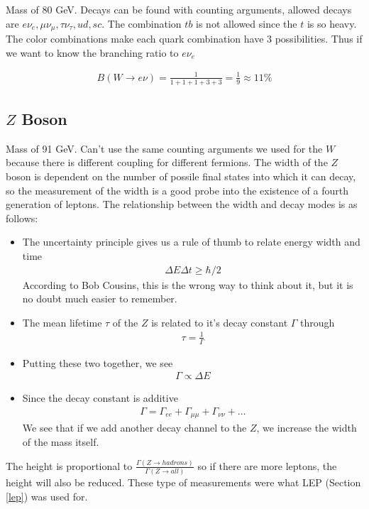 Mass of 80 GeV. Decays can be found with counting arguments, allowed decays are $e\nu_e, \mu\nu_\mu,\tau\nu_\tau, ud, sc$. The combination $tb$ is not allowed since the $t$ is so heavy. The color combinations make each quark combination have 3 possibilities. Thus if we want to know the branching ratio to $e\nu_e$

\begin{align}
B(W\rightarrow e\nu) = \frac{1}{1+1+1+3+3} = \frac{1}{9}\approx 11\%
\end{align}

\subsection{$Z$ Boson}

Mass of 91 GeV. Can't use the same counting arguments we used for the $W$ because there is different coupling for different fermions. The width of the $Z$ boson is dependent on the number of possile final states into which it can decay, so the measurement of the width is a good probe into the existence of a fourth generation of leptons\cite{bstone}. The relationship between the width and decay modes is as follows:
\begin{itemize}
    \item The uncertainty principle gives us a rule of thumb to relate energy width and time
    \begin{align}
    \Delta E\Delta t\ge \hbar/2
    \end{align}
    According to Bob Cousins, this is the wrong way to think about it, but it is no doubt much easier to remember.
    \item The mean lifetime $\tau$ of the $Z$ is related to it's decay constant $\Gamma$ through
    \begin{align}
    \tau = \frac{1}{\Gamma}
    \end{align}
    \item Putting these two together, we see
    \begin{align}
    \Gamma \propto \Delta E
    \end{align}
    \item Since the decay constant is additive
    \begin{align}
    \Gamma = \Gamma_{ee} + \Gamma_{\mu\mu} + \Gamma_{\nu\nu} +  \ldots
    \end{align}
    We see that if we add another decay channel to the $Z$, we increase the width of the mass itself.
\end{itemize}
The height is proportional to $\frac{\Gamma(Z\rightarrow hadrons)}{\Gamma(Z\rightarrow all)}$ so if there are more leptons, the height will also be reduced. These type of measurements were what LEP (Section \ref{lep}) was used for.

